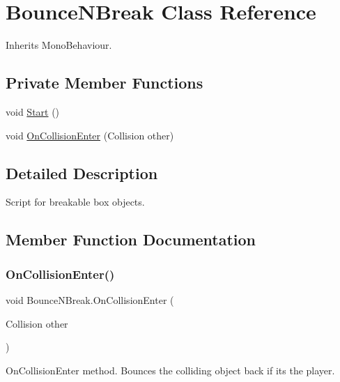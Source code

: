 \hypertarget{class_bounce_n_break}{}\section{Bounce\+N\+Break Class Reference}
\label{class_bounce_n_break}


Inherits Mono\+Behaviour.

\subsection*{Private Member Functions}
\begin{DoxyCompactItemize}
\item 
void \hyperlink{class_bounce_n_break_ab96786800939a3b8e2f6875e9dc5e9e3}{Start} ()
\item 
void \hyperlink{class_bounce_n_break_ad3b7ae5add7e4ba02b5d2875b90b82ee}{On\+Collision\+Enter} (Collision other)
\end{DoxyCompactItemize}


\subsection{Detailed Description}
Script for breakable box objects. 



\subsection{Member Function Documentation}
\mbox{\label{class_bounce_n_break_ad3b7ae5add7e4ba02b5d2875b90b82ee}} 
\subsubsection{\texorpdfstring{On\+Collision\+Enter()}{OnCollisionEnter()}}
{\footnotesize\ttfamily void Bounce\+N\+Break.\+On\+Collision\+Enter (\begin{DoxyParamCaption}\item[{Collision}]{other }\end{DoxyParamCaption})\hspace{0.3cm}{\ttfamily [private]}}



On\+Collision\+Enter method. Bounces the colliding object back if it\textquotesingle{}s the player. 


